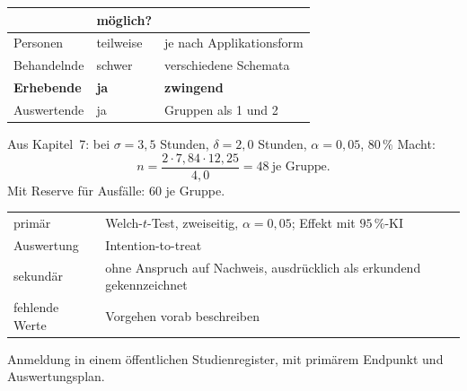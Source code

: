 \begin{aufgabe}
\begin{center}
\renewcommand{\arraystretch}{1.45}
\begin{tabular}{@{}P{2.6cm}P{2.0cm}P{3.0cm}@{}}
\toprule
& \textbf{möglich?} & \\
\midrule
Personen & \textcolor{mittel}{teilweise} & je nach Applikationsform\\
Behandelnde & \textcolor{akzent}{schwer} & verschiedene Schemata\\
\textbf{Erhebende} & \textcolor{gruen}{\textbf{ja}} & \textcolor{gruen}{\textbf{zwingend}}\\
Auswertende & \textcolor{gruen}{ja} & Gruppen als 1 und 2\\
\bottomrule
\end{tabular}
\end{center}

Aus Kapitel~7: bei $\sigma = 3{,}5$ Stunden, $\delta = 2{,}0$ Stunden, $\alpha = 0{,}05$, $80\,\%$ Macht:
\[ n = \frac{2 \cdot 7{,}84 \cdot 12{,}25}{4{,}0} = 48 \ \text{je Gruppe} . \]
Mit Reserve für Ausfälle: $60$ je Gruppe.

\begin{center}
\renewcommand{\arraystretch}{1.45}
\begin{tabular}{@{}P{2.4cm}P{5.8cm}@{}}
\toprule
primär & Welch-$t$-Test, zweiseitig, $\alpha = 0{,}05$; Effekt mit $95\,\%$-KI\\
Auswertung & Intention-to-treat\\
sekundär & ohne Anspruch auf Nachweis, ausdrücklich als erkundend gekennzeichnet\\
fehlende Werte & Vorgehen vorab beschreiben\\
\bottomrule
\end{tabular}
\end{center}

Anmeldung in einem öffentlichen Studienregister, mit primärem Endpunkt und Auswertungsplan.

\begin{center}
\begin{minipage}{0.86\textwidth}
\end{minipage}
\end{center}
\end{aufgabe}

